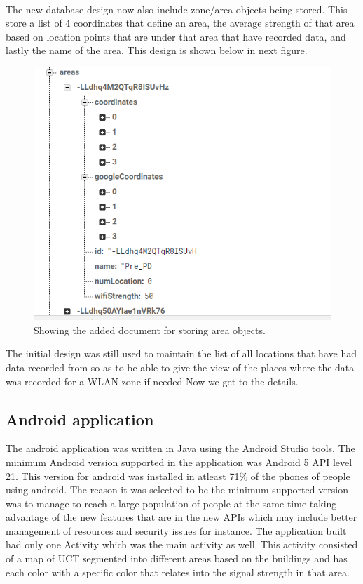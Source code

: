 \paragraph{}The new database design now also include zone/area objects being stored. This store a list of 4 coordinates that define an area,  the average strength of that area based on location points that are under that area that have recorded data, and lastly the name of the area. This design is shown below in next figure.
\begin{figure}
	\centering
	\includegraphics[width=0.7\linewidth]{images/2nd_db}
	\caption[]{Showing the added document for storing area objects.}
\end{figure}
The initial design was still used to maintain the list of all locations that have had data recorded from so as to be able to give the view of the places where the data was recorded for a WLAN zone if needed
Now we get to the details. 

\subsection*{Android application}
The android application was written in Java using the Android Studio tools. The minimum Android version supported in the application was Android 5 API level 21. This version for android was installed in atleast 71\% of the phones of people using android. The reason it was selected to be the minimum supported version was to manage to reach a large population of people at the same time taking advantage of the new features that are in the new APIs which may include better management of resources and security issues for instance. The application built had only one Activity which was the main activity as well. This activity consisted of a map of UCT segmented into different areas based on the buildings and has each color with a specific color that relates into the signal strength in that area. 

